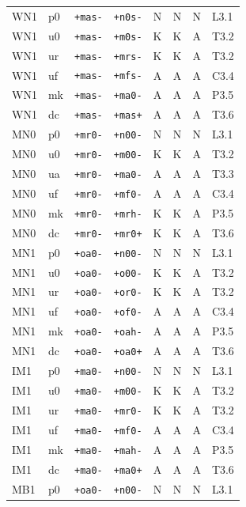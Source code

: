 {\begin{longtable}{@{}llllcccl@{}}
WN1 & p0 & \texttt{+mas-} & \texttt{+n0s-} & N & N & N & L3.1 \\
WN1 & u0 & \texttt{+mas-} & \texttt{+m0s-} & K & K & A & T3.2 \\
WN1 & ur & \texttt{+mas-} & \texttt{+mrs-} & K & K & A & T3.2 \\
WN1 & uf & \texttt{+mas-} & \texttt{+mfs-} & A & A & A & C3.4 \\
WN1 & mk & \texttt{+mas-} & \texttt{+ma0-} & A & A & A & P3.5 \\
WN1 & dc & \texttt{+mas-} & \texttt{+mas+} & A & A & A & T3.6 \\
MN0 & p0 & \texttt{+mr0-} & \texttt{+n00-} & N & N & N & L3.1 \\
MN0 & u0 & \texttt{+mr0-} & \texttt{+m00-} & K & K & A & T3.2 \\
MN0 & ua & \texttt{+mr0-} & \texttt{+ma0-} & A & A & A & T3.3 \\
MN0 & uf & \texttt{+mr0-} & \texttt{+mf0-} & A & A & A & C3.4 \\
MN0 & mk & \texttt{+mr0-} & \texttt{+mrh-} & K & K & A & P3.5 \\
MN0 & dc & \texttt{+mr0-} & \texttt{+mr0+} & K & K & A & T3.6 \\
MN1 & p0 & \texttt{+oa0-} & \texttt{+n00-} & N & N & N & L3.1 \\
MN1 & u0 & \texttt{+oa0-} & \texttt{+o00-} & K & K & A & T3.2 \\
MN1 & ur & \texttt{+oa0-} & \texttt{+or0-} & K & K & A & T3.2 \\
MN1 & uf & \texttt{+oa0-} & \texttt{+of0-} & A & A & A & C3.4 \\
MN1 & mk & \texttt{+oa0-} & \texttt{+oah-} & A & A & A & P3.5 \\
MN1 & dc & \texttt{+oa0-} & \texttt{+oa0+} & A & A & A & T3.6 \\
IM1 & p0 & \texttt{+ma0-} & \texttt{+n00-} & N & N & N & L3.1 \\
IM1 & u0 & \texttt{+ma0-} & \texttt{+m00-} & K & K & A & T3.2 \\
IM1 & ur & \texttt{+ma0-} & \texttt{+mr0-} & K & K & A & T3.2 \\
IM1 & uf & \texttt{+ma0-} & \texttt{+mf0-} & A & A & A & C3.4 \\
IM1 & mk & \texttt{+ma0-} & \texttt{+mah-} & A & A & A & P3.5 \\
IM1 & dc & \texttt{+ma0-} & \texttt{+ma0+} & A & A & A & T3.6 \\
MB1 & p0 & \texttt{+oa0-} & \texttt{+n00-} & N & N & N & L3.1 \\

\end{longtable}}
